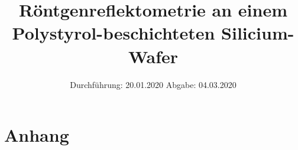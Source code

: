 
\usepackage{longtable}
\usepackage{wrapfig}
\usepackage{ dsfont }
\subject{VERSUCH 44}
\title{Röntgenreflektometrie an einem Polystyrol-beschichteten Silicium-Wafer}
\date{%
  \hspace{-2.5em}
  Durchführung: 20.01.2020
  \hspace{4em}
  Abgabe: 04.03.2020
}


  \setlength{\parindent}{0em}
  \maketitle
  \thispagestyle{empty}
  \newpage
  \tableofcontents
  \newpage





\printbibliography{}
%
\newpage
\section{Anhang}
\label{sec:anhang}


